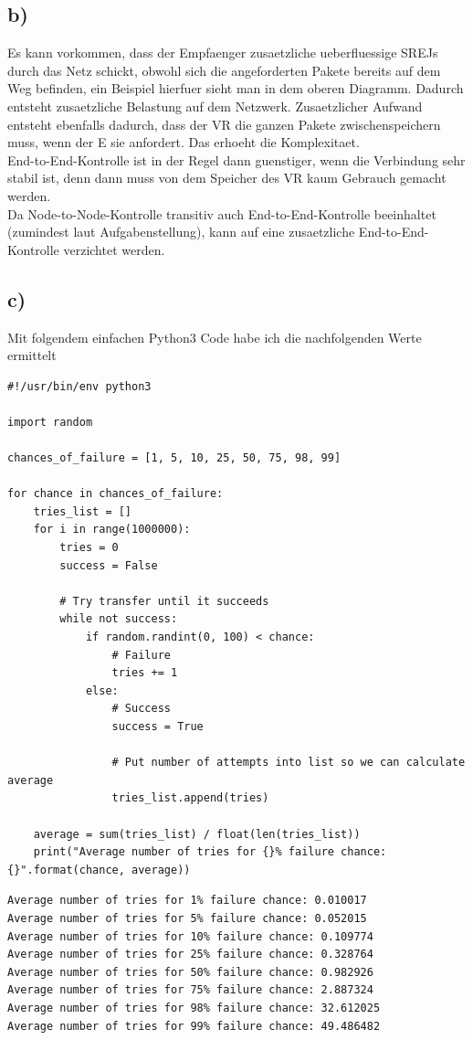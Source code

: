 \documentclass[a4paper,12pt]{scrartcl}
\begin{document}
\subsection{b)}
Es kann vorkommen, dass der Empfaenger zusaetzliche ueberfluessige SREJs
durch das Netz schickt, obwohl sich die angeforderten Pakete bereits auf dem
Weg befinden, ein Beispiel hierfuer sieht man in dem oberen Diagramm. Dadurch
entsteht zusaetzliche Belastung auf dem Netzwerk. Zusaetzlicher Aufwand entsteht
ebenfalls dadurch, dass der VR die ganzen Pakete zwischenspeichern muss,
wenn der E sie anfordert. Das erhoeht die Komplexitaet.\\
End-to-End-Kontrolle ist in der Regel dann guenstiger, wenn die Verbindung sehr
stabil ist, denn dann muss von dem Speicher des VR kaum Gebrauch gemacht werden.\\
Da Node-to-Node-Kontrolle transitiv auch End-to-End-Kontrolle beeinhaltet
(zumindest laut Aufgabenstellung), kann auf eine zusaetzliche End-to-End-Kontrolle
verzichtet werden.

\subsection{c)}
Mit folgendem einfachen Python3 Code habe ich die nachfolgenden Werte ermittelt

\begin{verbatim}
#!/usr/bin/env python3

import random

chances_of_failure = [1, 5, 10, 25, 50, 75, 98, 99]

for chance in chances_of_failure:
    tries_list = []
    for i in range(1000000):
        tries = 0
        success = False

        # Try transfer until it succeeds
        while not success:
            if random.randint(0, 100) < chance:
                # Failure
                tries += 1
            else:
                # Success
                success = True

                # Put number of attempts into list so we can calculate average
                tries_list.append(tries)

    average = sum(tries_list) / float(len(tries_list))
    print("Average number of tries for {}% failure chance: {}".format(chance, average))

\end{verbatim}

\begin{verbatim}
Average number of tries for 1% failure chance: 0.010017
Average number of tries for 5% failure chance: 0.052015
Average number of tries for 10% failure chance: 0.109774
Average number of tries for 25% failure chance: 0.328764
Average number of tries for 50% failure chance: 0.982926
Average number of tries for 75% failure chance: 2.887324
Average number of tries for 98% failure chance: 32.612025
Average number of tries for 99% failure chance: 49.486482
\end{verbatim}
\end{document}
